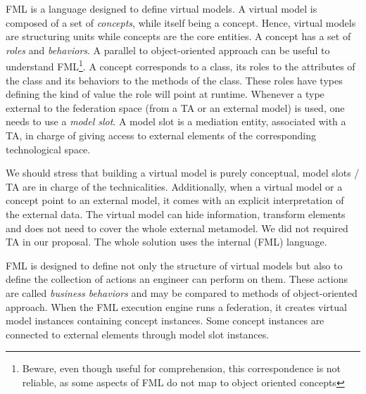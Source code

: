 FML is a language designed to define virtual models. A virtual model
is composed of a set of \emph{concepts}, while itself being a concept.
Hence, virtual models are structuring units while concepts are the
core entities. A concept has a set of \emph{roles} and
\emph{behaviors}. A parallel to object-oriented approach can be useful
to understand FML\footnote{Beware, even though useful for
  comprehension, this correspondence is not
  reliable, as some aspects of FML do not map to object oriented
  concepts}. A concept corresponds to a class, its roles to the
attributes of the class and its behaviors to the methods of the class.
These roles have types defining the kind of value the role will point
at runtime.
Whenever a type external to the federation space (from a TA or an
external model) is used, one needs to use a \emph{model slot}. A model
slot is a mediation entity, associated with a TA, in charge of giving
access to external elements of the corresponding technological space.

We should stress that building a virtual model is purely conceptual,
model slots / TA are in charge of the technicalities. Additionally,
when a virtual model or a concept point to an external model, it comes
with an explicit interpretation of the external data. The virtual
model can hide information, transform elements and does not need to
cover the whole external metamodel.
We did not required TA in our proposal. The whole solution uses the
internal (FML) language.

FML is designed to define not only the structure of virtual models but
also to define the collection of actions an engineer can perform on
them. These actions are called \emph{business behaviors} and may be
compared to methods of object-oriented approach.
When the FML execution engine runs a federation, it creates virtual
model instances containing concept instances. Some concept instances
are connected to external elements through model slot instances.

